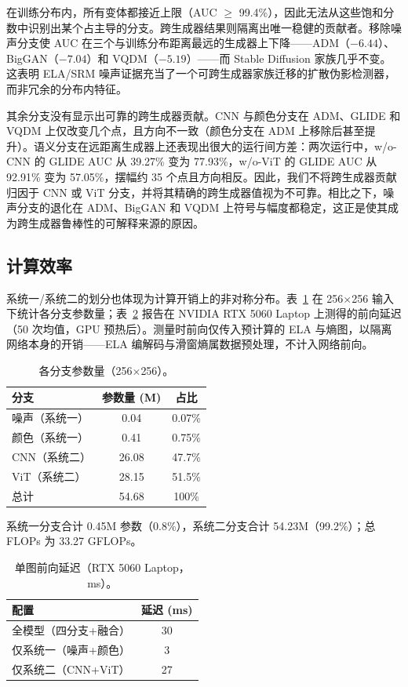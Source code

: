 \documentclass[11pt]{ctexart}
\begin{document}
在训练分布内，所有变体都接近上限（AUC $\geq$ 99.4\%），因此无法从这些饱和分数中识别出某个占主导的分支。跨生成器结果则隔离出唯一稳健的贡献者。移除噪声分支使 AUC 在三个与训练分布距离最远的生成器上下降——ADM（$-6.44$）、BigGAN（$-7.04$）和 VQDM（$-5.19$）——而 Stable Diffusion 家族几乎不变。这表明 ELA/SRM 噪声证据充当了一个可跨生成器家族迁移的扩散伪影检测器，而非冗余的分布内特征。

其余分支没有显示出可靠的跨生成器贡献。CNN 与颜色分支在 ADM、GLIDE 和 VQDM 上仅改变几个点，且方向不一致（颜色分支在 ADM 上移除后甚至提升）。语义分支在远距离生成器上还表现出很大的运行间方差：两次运行中，w/o-CNN 的 GLIDE AUC 从 39.27\% 变为 77.93\%，w/o-ViT 的 GLIDE AUC 从 92.91\% 变为 57.05\%，摆幅约 35 个点且方向相反。因此，我们不将跨生成器贡献归因于 CNN 或 ViT 分支，并将其精确的跨生成器值视为不可靠。相比之下，噪声分支的退化在 ADM、BigGAN 和 VQDM 上符号与幅度都稳定，这正是使其成为跨生成器鲁棒性的可解释来源的原因。

\subsection{计算效率}

系统一/系统二的划分也体现为计算开销上的非对称分布。表~\ref{tab:3} 在 256$\times$256 输入下统计各分支参数量；表~\ref{tab:4} 报告在 NVIDIA RTX 5060 Laptop 上测得的前向延迟（50 次均值，GPU 预热后）。测量时前向仅传入预计算的 ELA 与熵图，以隔离网络本身的开销——ELA 编解码与滑窗熵属数据预处理，不计入网络前向。

\begin{table}[h]
\centering
\caption{各分支参数量（256$\times$256）。}
\label{tab:3}
\begin{tabular}{lcc}
\toprule
分支 & 参数量 (M) & 占比 \\
\midrule
噪声（系统一） & 0.04 & 0.07\% \\
颜色（系统一） & 0.41 & 0.75\% \\
CNN（系统二） & 26.08 & 47.7\% \\
ViT（系统二） & 28.15 & 51.5\% \\
\midrule
总计 & 54.68 & 100\% \\
\bottomrule
\end{tabular}
\end{table}

系统一分支合计 0.45M 参数（0.8\%），系统二分支合计 54.23M（99.2\%）；总 FLOPs 为 33.27 GFLOPs。

\begin{table}[h]
\centering
\caption{单图前向延迟（RTX 5060 Laptop，ms）。}
\label{tab:4}
\begin{tabular}{lc}
\toprule
配置 & 延迟 (ms) \\
\midrule
全模型（四分支+融合） & 30 \\
仅系统一（噪声+颜色） & 3 \\
仅系统二（CNN+ViT） & 27 \\
\bottomrule
\end{tabular}
\end{table}
\end{document}
